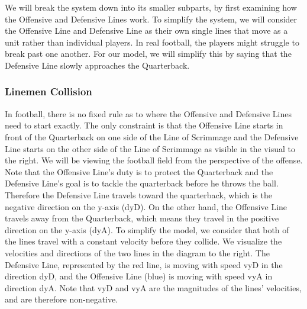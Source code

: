 We will break the system down into its smaller subparts, by first examining how the Offensive and Defensive Lines work. To simplify the system, we will consider the Offensive Line and Defensive Line as their own single lines that move as a unit rather than individual players. In real football, the players might struggle to break past one another. For our model, we will simplify this by saying that the Defensive Line slowly approaches the Quarterback.

\subsubsection{Linemen Collision}
In football, there is no fixed rule as to where the Offensive and Defensive Lines need to start exactly. The only constraint is that the Offensive Line starts in front of the Quarterback on one side of the Line of Scrimmage and the Defensive Line starts on the other side of the Line of Scrimmage as visible in the visual to the right. We will be viewing the football field from the perspective of the offense.
Note that the Offensive Line’s duty is to protect the Quarterback and the Defensive Line’s goal is to tackle the quarterback before he throws the ball. Therefore the Defensive Line travels toward the quarterback, which is the negative direction on the y-axis (dyD). On the other hand, the Offensive Line travels away from the Quarterback, which means they travel in the positive direction on the y-axis (dyA). To simplify the model, we consider that both of the lines travel with a constant velocity before they collide. We visualize the velocities and directions of the two lines in the diagram to the right. 
The Defensive Line, represented by the red line, is moving with speed vyD in the direction dyD, and the Offensive Line (blue) is moving with speed vyA in direction dyA. Note that vyD and vyA are the magnitudes of the lines' velocities, and are therefore non-negative.
 
